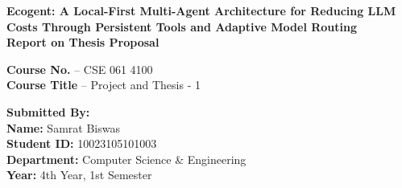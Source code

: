 \documentclass[12pt,a4paper]{article}
\begin{document}
\begin{titlepage}
    \centering
    \vspace*{1cm}
    
    {\Large \textbf{Ecogent: A Local-First Multi-Agent Architecture for Reducing LLM Costs Through Persistent Tools and Adaptive Model Routing}} \\
    
    \vspace{1.5cm}
    {\large \textbf{Report on Thesis Proposal}} \\
    
    \vspace{2cm}
    
    \textbf{Course No.} -- CSE 061 4100 \\
    \textbf{Course Title} -- Project and Thesis - 1 \\

    \vspace{1.5cm}

    {\Large \textbf{Submitted By:}} \\
        \vspace{0.5cm}
    \textbf{Name:} Samrat Biswas \\
    \vspace{0.3cm}
    \textbf{Student ID:} 10023105101003 \\
    \vspace{0.3cm}
    \textbf{Department:} Computer Science \& Engineering \\
    \vspace{0.3cm}
    \textbf{Year:} 4th Year, 1st Semester

    
    \vfill
\end{titlepage}

\begin{abstract}
\noindent Large Language Model (LLM)-based agents have strong capabilities in autonomous task execution across domains such as software engineering, browser automation, and system operations. However, existing agent architectures suffer from inefficient memory utilization, high token cost, and a lack of structured execution control. This research proposes \textbf{Ecogent} (Economical Cognitive Agent), a Workflow-Driven, Local-First Multi-Agent Architecture that integrates structured workflow representations, semantic memory retrieval using Chroma DB, and dynamic tool selection. The system distributes tasks across main and sub-workflows, represented as JSON, while storing compressed semantic keys in a vector database for efficient retrieval. A lightweight local NLP+ML supervisor model orchestrates task routing among specialized agents (coding, browser, testing, and OS), falling back to a local tiny deep learning model and only invoking cloud LLMs as a last resort. Experimental design suggests that this architecture significantly reduces redundant reasoning, lowers cloud API costs, and improves execution efficiency compared to traditional monolithic, cloud-native agent systems.
\end{abstract}
\end{document}
